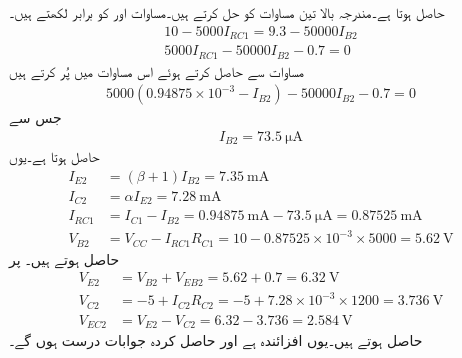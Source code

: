 حاصل ہوتا ہے۔مندرجہ بالا تین مساوات کو حل کرتے ہیں۔مساوات  اور  کو برابر لکھتے ہیں۔
\begin{align*}
10-5000 I_{RC1}=9.3-50000 I_{B2}\\
5000 I_{RC1}-50000 I_{B2}-0.7=0
\end{align*}
مساوات  سے  حاصل کرتے ہوئے اس مساوات میں پُر کرتے ہیں
\begin{align*}
5000 \left(0.94875 \times 10^{-3}-I_{B2} \right)-50000 I_{B2}-0.7=0
\end{align*}
جس سے
\begin{align*}
I_{B2}=\SI{73.5}{\micro \ampere}
\end{align*}
حاصل ہوتا ہے۔یوں
\begin{align*}
I_{E2}&=\left(\beta+1 \right) I_{B2}=\SI{7.35}{\milli \ampere}\\
I_{C2}&=\alpha I_{E2}=\SI{7.28}{\milli \ampere}\\
I_{RC1}&=I_{C1}-I_{B2}=\SI{0.94875}{\milli \ampere}-\SI{73.5}{\micro \ampere}=\SI{0.87525}{\milli \ampere}\\
V_{B2}&=V_{CC}-I_{RC1}R_{C1}=10-0.87525 \times 10^{-3} \times  5000=\SI{5.62}{\volt}
\end{align*}
حاصل ہوتے ہیں۔ پر
\begin{align*}
V_{E2}&=V_{B2}+V_{EB2}=5.62+0.7=\SI{6.32}{\volt}\\
V_{C2}&=-5+I_{C2} R_{C2}=-5+7.28 \times 10^{-3} \times 1200=\SI{3.736}{\volt}\\
V_{EC2}&=V_{E2}-V_{C2}=6.32-3.736=\SI{2.584}{\volt}
\end{align*}
حاصل ہوتے ہیں۔یوں  افزائندہ ہے اور حاصل کردہ جوابات درست ہوں گے۔

